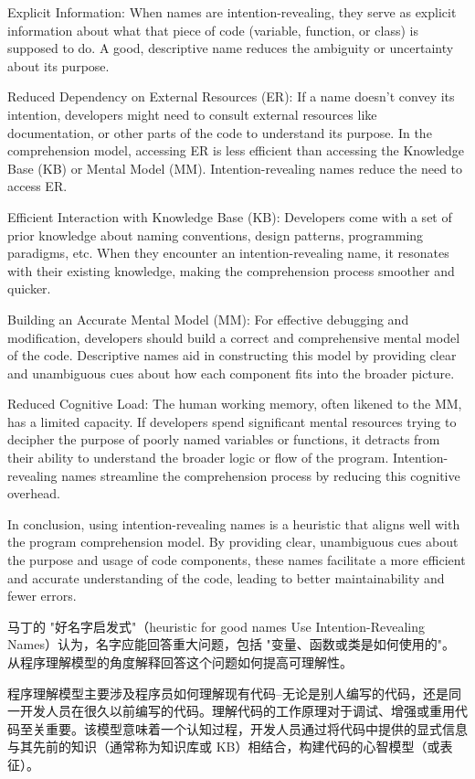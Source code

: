 \documentclass[]{ctexbook}
\begin{document}
Explicit Information: When names are intention-revealing, they serve as explicit information about what that piece of code (variable, function, or class) is supposed to do. A good, descriptive name reduces the ambiguity or uncertainty about its purpose.

Reduced Dependency on External Resources (ER): If a name doesn't convey its intention, developers might need to consult external resources like documentation, or other parts of the code to understand its purpose. In the comprehension model, accessing ER is less efficient than accessing the Knowledge Base (KB) or Mental Model (MM). Intention-revealing names reduce the need to access ER.

Efficient Interaction with Knowledge Base (KB): Developers come with a set of prior knowledge about naming conventions, design patterns, programming paradigms, etc. When they encounter an intention-revealing name, it resonates with their existing knowledge, making the comprehension process smoother and quicker.

Building an Accurate Mental Model (MM): For effective debugging and modification, developers should build a correct and comprehensive mental model of the code. Descriptive names aid in constructing this model by providing clear and unambiguous cues about how each component fits into the broader picture.

Reduced Cognitive Load: The human working memory, often likened to the MM, has a limited capacity. If developers spend significant mental resources trying to decipher the purpose of poorly named variables or functions, it detracts from their ability to understand the broader logic or flow of the program. Intention-revealing names streamline the comprehension process by reducing this cognitive overhead.

In conclusion, using intention-revealing names is a heuristic that aligns well with the program comprehension model. By providing clear, unambiguous cues about the purpose and usage of code components, these names facilitate a more efficient and accurate understanding of the code, leading to better maintainability and fewer errors.

马丁的 "好名字启发式"（heuristic for good names Use Intention-Revealing Names）认为，名字应能回答重大问题，包括 "变量、函数或类是如何使用的"。
从程序理解模型的角度解释回答这个问题如何提高可理解性。

程序理解模型主要涉及程序员如何理解现有代码--无论是别人编写的代码，还是同一开发人员在很久以前编写的代码。理解代码的工作原理对于调试、增强或重用代码至关重要。该模型意味着一个认知过程，开发人员通过将代码中提供的显式信息与其先前的知识（通常称为知识库或 KB）相结合，构建代码的心智模型（或表征）。
\end{document}
